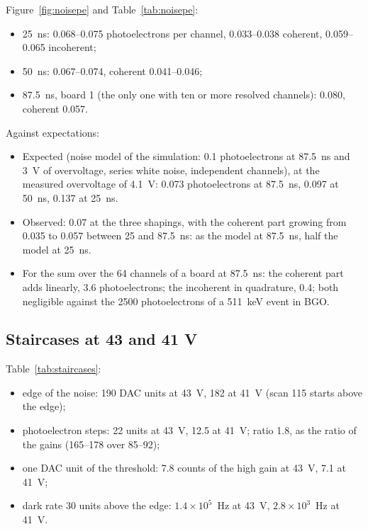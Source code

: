 \documentclass[11pt,a4paper]{article}
\newcommand{\results}{../../../fullsim_analysis/results/bench/2026-10-27}
\begin{document}
Figure~\ref{fig:noisepe} and Table~\ref{tab:noisepe}:
\begin{itemize}
\item 25~ns: 0.068--0.075 photoelectrons per channel, 0.033--0.038 coherent, 0.059--0.065
  incoherent;
\item 50~ns: 0.067--0.074, coherent 0.041--0.046;
\item 87.5~ns, board 1 (the only one with ten or more resolved channels): 0.080, coherent
  0.057.
\end{itemize}
Against expectations:
\begin{itemize}
\item Expected (noise model of the simulation: 0.1 photoelectrons at 87.5~ns and 3~V of
  overvoltage, series white noise, independent channels), at the measured overvoltage of
  4.1~V: 0.073 photoelectrons at 87.5~ns, 0.097 at 50~ns, 0.137 at 25~ns.
\item Observed: 0.07 at the three shapings, with the coherent part growing from 0.035 to
  0.057 between 25 and 87.5~ns: as the model at 87.5~ns, half the model at 25~ns.
\item For the sum over the 64 channels of a board at 87.5~ns: the coherent part adds
  linearly, 3.6 photoelectrons; the incoherent in quadrature, 0.4; both negligible against
  the 2500 photoelectrons of a 511~keV event in BGO.
\end{itemize}

\subsection{Staircases at 43 and 41 V}

\begin{table}[H]
\centering
\small

\caption{Staircases of board 1: bias, edge of the noise of the fast shaper, spacing of the
photoelectron steps and dark rate 30 DAC units above the edge, medians over the channels with
their ranges.}
\label{tab:staircases}
\end{table}

Table~\ref{tab:staircases}:
\begin{itemize}
\item edge of the noise: 190 DAC units at 43~V, 182 at 41~V (scan 115 starts above the edge);
\item photoelectron steps: 22 units at 43~V, 12.5 at 41~V; ratio 1.8, as the ratio of the
  gains (165--178 over 85--92);
\item one DAC unit of the threshold: 7.8 counts of the high gain at 43~V, 7.1 at 41~V;
\item dark rate 30 units above the edge: $1.4\times 10^{5}$~Hz at 43~V, $2.8\times 10^{3}$~Hz
  at 41~V.
\end{itemize}
\end{document}
